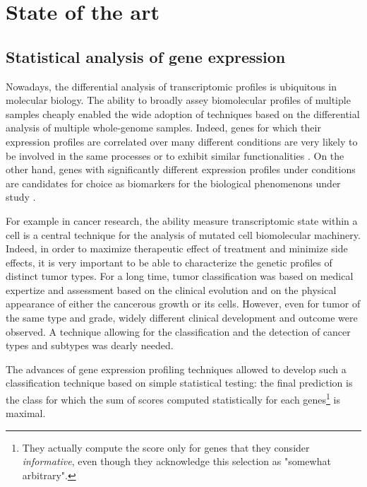 \chapter{State of the art}
\label{chap:state}



\section{Statistical analysis of gene expression}

	Nowadays, the differential analysis of transcriptomic profiles is ubiquitous in molecular biology.
	The ability to broadly assey biomolecular profiles of multiple samples cheaply enabled the wide adoption of techniques based on the differential analysis of multiple whole-genome samples.
	Indeed, genes for which their expression profiles are correlated over many different conditions are very likely to be involved in the same processes or to exhibit similar functionalities \parencite{ideker2002discovering}.
	On the other hand, genes with significantly different expression profiles under conditions are candidates for choice as biomarkers for the biological phenomenons under study \parencite{altman2001whole}.

	For example in cancer research, the ability measure transcriptomic state within a cell is a central technique for the analysis of mutated cell biomolecular machinery.
	Indeed, in order to maximize therapeutic effect of treatment and minimize side effects, it is very important to be able to characterize the genetic profiles of distinct tumor types.
	For a long time, tumor classification was based on medical expertize and assessment based on the clinical evolution and on the physical appearance of either the cancerous growth or its cells.
	However, even for tumor of the same type and grade, widely different clinical development and outcome were observed.
	A technique allowing for the classification and the detection of cancer types and subtypes was dearly needed.

	The advances of gene expression profiling techniques allowed \textcite{golub1999molecular} to develop such a classification technique based on simple statistical testing: the final prediction is the class for which the sum of scores computed statistically for each genes\footnote{They actually compute the score only for genes that they consider \emph{informative}, even though they acknowledge this selection as "somewhat arbitrary".} is maximal.


